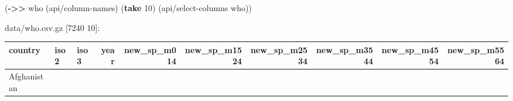 \documentclass[]{article}
\newenvironment{Shaded}{\begin{snugshade}}{\end{snugshade}}
\newcommand{\KeywordTok}[1]{\textcolor[rgb]{0.13,0.29,0.53}{\textbf{#1}}}
\newcommand{\DecValTok}[1]{\textcolor[rgb]{0.00,0.00,0.81}{#1}}
\newcommand{\NormalTok}[1]{#1}
\begin{document}
\begin{Shaded}
\begin{Highlighting}[]
\NormalTok{(}\KeywordTok{->>}\NormalTok{ who}
\NormalTok{     (api/column-names)}
\NormalTok{     (}\KeywordTok{take} \DecValTok{10}\NormalTok{)}
\NormalTok{     (api/select-columns who))}
\end{Highlighting}
\end{Shaded}

data/who.csv.gz {[}7240 10{]}:

\begin{longtable}[]{@{}lllrrrrrrr@{}}
\toprule
\begin{minipage}[b]{0.08\columnwidth}\raggedright\strut
country\strut
\end{minipage} & \begin{minipage}[b]{0.04\columnwidth}\raggedright\strut
iso2\strut
\end{minipage} & \begin{minipage}[b]{0.04\columnwidth}\raggedright\strut
iso3\strut
\end{minipage} & \begin{minipage}[b]{0.04\columnwidth}\raggedleft\strut
year\strut
\end{minipage} & \begin{minipage}[b]{0.08\columnwidth}\raggedleft\strut
new\_sp\_m014\strut
\end{minipage} & \begin{minipage}[b]{0.09\columnwidth}\raggedleft\strut
new\_sp\_m1524\strut
\end{minipage} & \begin{minipage}[b]{0.09\columnwidth}\raggedleft\strut
new\_sp\_m2534\strut
\end{minipage} & \begin{minipage}[b]{0.09\columnwidth}\raggedleft\strut
new\_sp\_m3544\strut
\end{minipage} & \begin{minipage}[b]{0.09\columnwidth}\raggedleft\strut
new\_sp\_m4554\strut
\end{minipage} & \begin{minipage}[b]{0.09\columnwidth}\raggedleft\strut
new\_sp\_m5564\strut
\end{minipage}\tabularnewline
\midrule
\endhead
\begin{minipage}[t]{0.08\columnwidth}\raggedright\strut
Afghanistan\strut
\end{minipage} & \begin{minipage}[t]{0.04\columnwidth}\raggedright\strut

\end{minipage}
\end{longtable}
\end{document}
